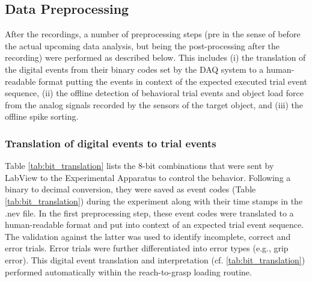 {\subsection{Data Preprocessing}

After the recordings, a number of preprocessing steps (pre in the sense of before the actual upcoming data analysis, but being the post-processing after the recording) were performed as described below. This includes (i) the translation of the digital events from their binary codes set by the DAQ system to a human-readable format putting the events in context of the expected executed trial event sequence, (ii) the offline detection of behavioral trial events and object load force from the analog signals recorded by the sensors of the target object, and (iii) the offline spike sorting.

\subsubsection{Translation of digital events to trial events }

Table \cref{tab:bit_translation} lists the 8-bit combinations that were sent by LabView to the Experimental Apparatus to control the behavior. Following a binary to decimal conversion, they were saved as event codes (Table \cref{tab:bit_translation}) during the experiment along with their time stamps in the .nev file. In the first preprocessing step, these event codes were translated to a human-readable format and put into context of an expected trial event sequence. The validation against the latter was used to identify incomplete, correct and error trials. Error trials were further differentiated into error types (e.g., grip error). This digital event translation and interpretation (cf. \cref{tab:bit_translation}) performed automatically within the reach-to-grasp loading routine. 

}
